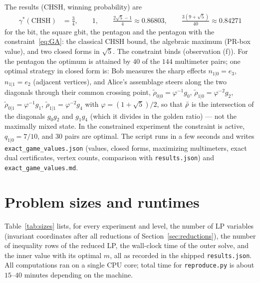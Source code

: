 \documentclass[11pt,a4paper]{article}
\newcommand*{\code}[1]{\texttt{#1}}
\theoremstyle{remark}
\begin{document}
\noindent The results (CHSH, winning probability) are
\begin{align*}
 \gamma^*(\mathrm{CHSH}) &= \tfrac34,\qquad 1,\qquad \tfrac{2\sqrt5-1}{4}\approx 0.86803,\qquad
 \tfrac{3(9+\sqrt5)}{40}\approx 0.84271
\end{align*}
for the bit, the square gbit, the pentagon and the pentagon with the
constraint~\eqref{eq:GA}: the classical CHSH bound, the algebraic maximum
(PR-box value), and two closed forms in $\sqrt5$. The constraint binds
(observation (f)). For the pentagon the optimum is attained by $40$ of the
$144$ multimeter pairs; one optimal strategy in closed form is: Bob measures
the sharp effects $n_{1\vert 0}=e_3$, $n_{1\vert 1}=e_2$ (adjacent
vertices), and Alice's assemblage steers along the two diagonals through
their common crossing point, $\tilde\rho_{0\vert 0}=\varphi^{-1}g_0$,
$\tilde\rho_{1\vert 0}=\varphi^{-2}g_2$, $\tilde\rho_{0\vert 1}=\varphi^{-1}g_1$,
$\tilde\rho_{1\vert 1}=\varphi^{-2}g_4$ with $\varphi=(1+\sqrt5)/2$, so that
$\Bar\rho$ is the intersection of the diagonals $g_0g_2$ and $g_1g_4$ (which
it divides in the golden ratio) --- not the maximally mixed state. In the
constrained experiment the constraint is active, $q_{1\vert 0}=7/10$, and
$30$ pairs are optimal. The script runs in a few seconds and writes
\code{exact\_game\_values.json} (values, closed forms, maximizing
multimeters, exact dual certificates, vertex counts, comparison with
\code{results.json}) and \code{exact\_game\_values.md}.

\section{Problem sizes and runtimes}\label{sec:sizes}

Table~\ref{tab:sizes} lists, for every experiment and level, the number of
LP variables (invariant coordinates after all reductions of
Section~\ref{sec:reductions}), the number of inequality rows of the
reduced LP, the wall-clock time of the outer solve, and the inner value
with its optimal $m$, all as recorded in the shipped \code{results.json}.
All computations ran on a single CPU core; total time for
\code{reproduce.py} is about $15$--$40$ minutes depending on the machine.
\end{document}
